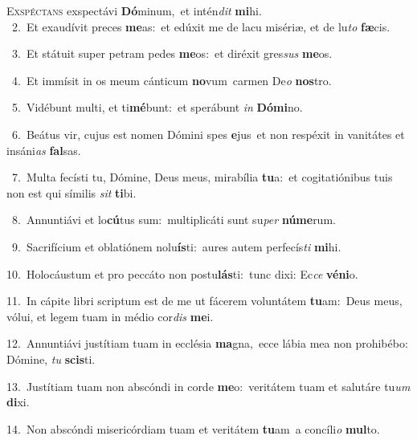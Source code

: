 \lettrine{\initial\textcolor{\initialcolor}{E}}{xspéctans} exspectávi \textbf{Dó}\-minum,~\star et intén\textit{dit} \textbf{mi}\-hi.\\
{\numbfont\textcolor{\numbcolor}{~2.}}~Et exaudívit preces \textbf{me}\-as:~\star et edúxit me de lacu misériæ, et de lu\textit{to} \textbf{fæ}\-cis.\par
{\numbfont\textcolor{\numbcolor}{~3.}}~Et státuit super petram pedes \textbf{me}\-os:~\star et diréxit gres\textit{sus} \textbf{me}\-os.\par
{\numbfont\textcolor{\numbcolor}{~4.}}~Et immísit in os meum cánticum \textbf{no}\-vum~\star carmen De\textit{o} \textbf{nos}\-tro.\par
{\numbfont\textcolor{\numbcolor}{~5.}}~Vidébunt multi, et ti\-\textbf{mé}\-bunt:~\star et sperábunt \textit{in} \textbf{Dó}\-\textbf{mi}no.\par
{\numbfont\textcolor{\numbcolor}{~6.}}~Beátus vir, cujus est nomen Dómini spes \textbf{e}\-jus~\star et non respéxit in vanitátes et insáni\textit{as} \textbf{fal}\-sas.\par
{\numbfont\textcolor{\numbcolor}{~7.}}~Multa fecísti tu, Dómine, Deus meus, mirabília \textbf{tu}\-a:~\star et cogitatiónibus tuis non est qui símilis \textit{sit} \textbf{ti}\-bi.\par
{\numbfont\textcolor{\numbcolor}{~8.}}~Annuntiávi et lo\-\textbf{cú}\-tus sum:~\star multiplicáti sunt su\textit{per} \textbf{nú}\-\textbf{me}rum.\par
{\numbfont\textcolor{\numbcolor}{~9.}}~Sacrifícium et oblatiónem nolu\-\textbf{ís}\-ti:~\star aures autem perfecís\textit{ti} \textbf{mi}\-hi.\par
{\numbfont\textcolor{\numbcolor}{10.}}~Holocáustum et pro peccáto non postu\-\textbf{lás}\-ti:~\star tunc dixi: Ec\textit{ce} \textbf{vé}\-\textbf{ni}o.\par
{\numbfont\textcolor{\numbcolor}{11.}}~In cápite libri scriptum est de me ut fácerem voluntátem \textbf{tu}\-am:~\star Deus meus, vólui, et legem tuam in médio cor\textit{dis} \textbf{me}\-i.\par
{\numbfont\textcolor{\numbcolor}{12.}}~Annuntiávi justítiam tuam in ecclésia \textbf{ma}\-gna,~\star ecce lábia mea non prohibébo: Dómine, \textit{tu} \textbf{scis}\-ti.\par
{\numbfont\textcolor{\numbcolor}{13.}}~Justítiam tuam non abscóndi in corde \textbf{me}\-o:~\star veritátem tuam et salutáre tu\textit{um} \textbf{di}\-xi.\par
{\numbfont\textcolor{\numbcolor}{14.}}~Non abscóndi misericórdiam tuam et veritátem \textbf{tu}\-am~\star a concíli\textit{o} \textbf{mul}\-to.\par
